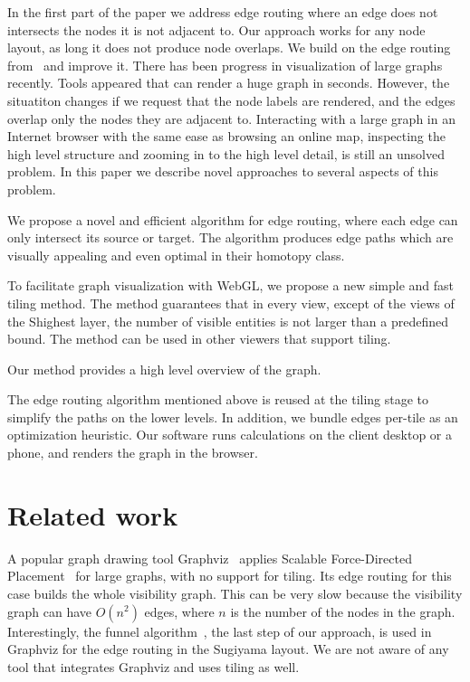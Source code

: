 \documentclass{gd-llncs}
\begin{document}
In the first part of the paper we address edge routing where an edge does not intersects the nodes it is not adjacent to. Our approach works for any node layout, as long it does not produce node overlaps.
We build on the edge routing from~\cite{dwyer2010fast} and improve it.
There has been progress in visualization of large graphs recently. Tools appeared that can render a huge graph in seconds. However, the situatiton changes if we request that the node labels are rendered, and the edges overlap only the nodes they are adjacent to. Interacting with a large graph in an Internet browser with the same ease as browsing an online map, inspecting the high level structure and zooming in to the high level detail, is still an unsolved problem. In this paper we describe novel approaches to several aspects of this problem.

We propose a novel and efficient algorithm for edge routing, where each edge can only intersect its source or target. The algorithm produces edge paths which are visually appealing and even optimal in their homotopy class.

To facilitate graph visualization with WebGL, we propose a new simple and fast tiling method. The method guarantees that in every view,
except of the views of the Shighest layer, the number of visible entities is not larger than a
predefined bound. The method can be used in other viewers that support tiling.

Our method provides a high level overview of the graph.

The edge routing algorithm mentioned above is reused at the tiling stage 
to simplify the paths on the lower levels. In addition, we bundle edges per-tile as an optimization heuristic.
Our software runs calculations on the client desktop or a phone, and renders the graph in the browser.
\section*{Related work}
A popular graph drawing tool Graphviz~\cite{graphviz} applies
Scalable Force-Directed Placement~\cite{sfdp} for large graphs, with no
support for tiling. Its edge routing for this case builds the whole
visibility graph. This can be very slow because the visibility graph can have $O(n^2)$ edges,
where $n$ is the number of the nodes in the graph.
Interestingly, the funnel algorithm~\cite{chazelle1982theorem,hershberger1994computing},
the last step of our approach, is used in Graphviz for the edge routing in the
Sugiyama layout. We are not aware of any tool that integrates Graphviz
and uses tiling as well.
\end{document}
